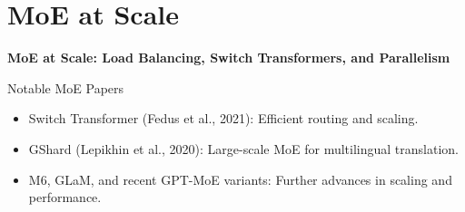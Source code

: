 \section{MoE at Scale}
\begin{frame}{}
    \LARGE \textbf{MoE at Scale: Load Balancing, Switch Transformers, and Parallelism}
\end{frame}

\begin{frame}{Notable MoE Papers}
    \begin{itemize}
        \item Switch Transformer (Fedus et al., 2021): Efficient routing and scaling.
        \item GShard (Lepikhin et al., 2020): Large-scale MoE for multilingual translation.
        \item M6, GLaM, and recent GPT-MoE variants: Further advances in scaling and performance.
    \end{itemize}
\end{frame}

